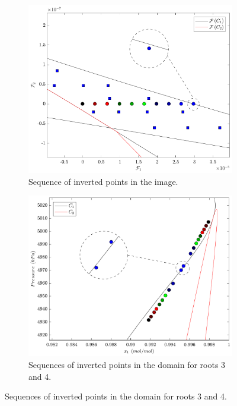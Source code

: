 \documentclass[journal=iecred,manuscript=article]{achemso}
\theoremstyle{definition}
\theoremstyle{remark}
\begin{document}
\begin{figure}[!ht]
\centering
\begin{subfigure}{.48\textwidth}
  \centering
  \includegraphics[width=\linewidth]{sequencia_pontos_imagem.pdf}
  \caption{Sequence of inverted points in the image.}
  \label{fig:points_image}
\end{subfigure}\hfill
\begin{subfigure}{.48\textwidth}
  \centering
  \includegraphics[width=\linewidth]{sequencia_pontos_dominio.pdf}
  \caption{Sequences of inverted points in the domain for roots 3 and 4.}
  \label{fig:points_domain_3_4}

\end{subfigure}
\end{figure}
\end{document}
